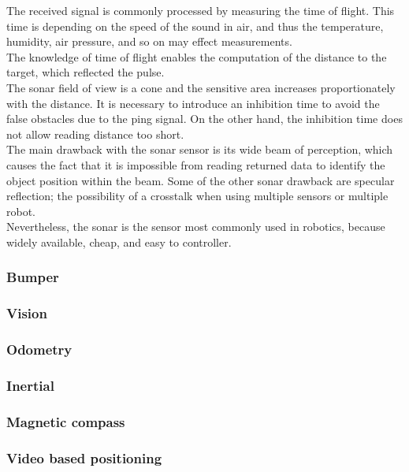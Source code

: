 The received signal is commonly processed by measuring the time of flight.
This time is depending on the speed of the sound in air, and thus the
temperature, humidity, air pressure, and so on may effect measurements.
\\
The knowledge of time of flight enables the computation of the distance
to the target, which reflected the pulse.
\\
The sonar field of view is a cone and the sensitive area increases proportionately
with the distance. It is necessary to introduce an inhibition time to avoid the false
obstacles due to the ping signal. On the other hand, the inhibition time does
not allow reading distance too short.
\\
The main drawback with the sonar sensor is its wide beam of perception, which
causes the fact that it is impossible from reading returned data to identify
the object position within the beam. Some of the other sonar drawback are specular
reflection; the possibility of a crosstalk when using multiple sensors
or multiple robot.
\\
Nevertheless, the sonar is the sensor most commonly used in robotics, because
widely available, cheap, and easy to controller.

\subsubsection{Bumper}
\label{sec:mobile:bumper}


\subsubsection{Vision}
\label{sec:mobile:vision}


\subsubsection{Odometry}
\label{sec:mobile:odometry}

\subsubsection{Inertial}
\label{sec:mobile:inertial}

\subsubsection{Magnetic compass}
\label{sec:mobile:compass}

\subsubsection{Video based positioning}
\label{sec:mobile:video}

